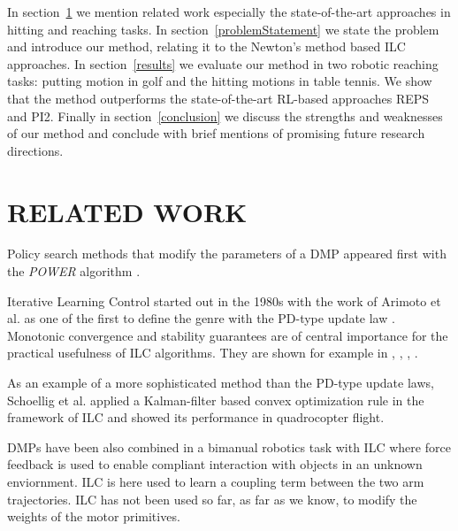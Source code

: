 In section~\ref{relatedWork} we mention related work especially the state-of-the-art approaches in hitting and reaching tasks. In section~\ref{problemStatement} we state the problem and introduce our method, relating it to the Newton's method based ILC approaches. In section~\ref{results} we evaluate our method in two robotic reaching tasks: putting motion in golf and the hitting motions in table tennis. We show that the method outperforms the state-of-the-art RL-based approaches REPS and PI2. Finally in section~\ref{conclusion} we discuss the strengths and weaknesses of our method and conclude with brief mentions of promising future research directions.


\section{RELATED WORK}\label{relatedWork}


Policy search methods that modify the parameters of a DMP appeared first with the \emph{POWER} algorithm \cite{Kober08}.

Iterative Learning Control started out in the 1980s with the work of Arimoto et al. \cite{Arimoto84} as one of the first to define the genre with the PD-type update law \cite{Bristow06}. Monotonic convergence and stability guarantees are of central importance for the practical usefulness of ILC algorithms. They are shown for example in \cite{Bristow06}, \cite{Norrloef02}, \cite{Lee97}, \cite{Longman2000}.

As an example of a more sophisticated method than the PD-type update laws, Schoellig et al. \cite{Schoellig12} applied a Kalman-filter based convex optimization rule in the framework of ILC and showed its performance in quadrocopter flight. 

DMPs have been also combined in a bimanual robotics task with ILC \cite{Gams13} where force feedback is used to enable compliant interaction with objects in an unknown enviornment. ILC is here used to learn a coupling term between the two arm trajectories. ILC has not been used so far, as far as we know, to modify the weights of the motor primitives.

